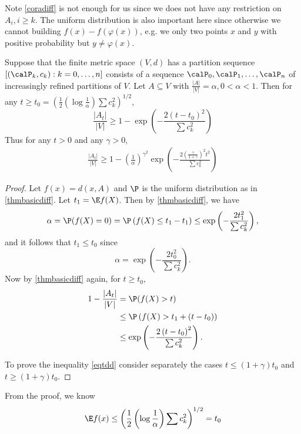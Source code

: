\documentclass{article}
\begin{document}
\begin{rema}
Note \cref{coradiff} is not enough for us since we does not have any restriction on $A_i, i\ge k$. The uniform distribution is also important here since otherwise we cannot building $f(x)-f(\varphi(x))$, e.g. we only two points $x$ and $y$ with positive probability but $y\ne \varphi(x)$.
\end{rema}
\begin{cora}\label{corbasicdiff}
Suppose that the finite metric space $( V , d )$ has a partition sequence $\left[\left( \calP_k , c _{ k }\right): k =0, \ldots, n \right]$ consists of a sequence $\calP_{0}, \calP_{1}, \ldots, \calP_{ n }$ of {increasingly refined partitions} of $V$. Let $A \subseteq V$ with $\frac{|A|}{|V|}=\alpha, 0<\alpha<1 .$ Then for any $t \geq t_{0}=\left(\frac{1}{2}\left(\log \frac{1}{\alpha}\right) \sum c_{k}^{2}\right)^{1 / 2}$,
$$
\frac{\left|A_{t}\right|}{|V|} \geq 1-\exp \left(-\frac{2\left(t-t_{0}\right)^{2}}{\sum c_{k}^{2}}\right)
$$
Thus for any $t>0$ and any $\gamma>0$,
\begin{align}
    \frac{\left|A_{t}\right|}{|V|} \geq 1-\left(\frac{1}{\alpha}\right)^{\gamma^{2}} \exp \left(-\frac{2\left(\frac{\gamma}{1+\gamma}\right)^{2} t^{2}}{\sum c_{k}^{2}}\right)\label{eqtdd}
\end{align}
\end{cora}

\begin{proof}
Let $f(x) = d(x,A)$ and $\P$ is the uniform distribution as in \cref{thmbasicdiff}. 
Let $t_{1}=\E f(X)$. Then by \cref{thmbasicdiff}, we have 
$$
\alpha= \P ( f ( X )=0)= \P \left( f ( X ) \leq t _{1}- t _{1}\right) \leq \exp \left(-\frac{2 t _{1}^{2} }{\sum c_{ k }^{2}}\right),
$$
and it follows that $t_{1} \leq t_{0}$ since 
$$
\alpha =\exp\left( -\frac{2t_0^2}{\sum c_k^2}\right).
$$
Now by \cref{thmbasicdiff} again, for $t \geq t_{0}$,
\begin{align*}
1-\frac{\left|A_{t}\right|}{|V|} &=\P(f(X)>t) \\
&\leq  \P\left(f(X)>t_{1}+\left(t-t_{0}\right)\right) \\
&\leq  \exp \left(-\frac{2\left(t-t_{0}\right)^{2} }{ \sum c_{k}^{2}}\right) .
\end{align*}

To prove the inequality \cref{eqtdd} consider separately the cases $t \leq(1+\gamma) t_{0}$ and $t \geq(1+\gamma) t _{0}$.
\end{proof}
\begin{rema} From the proof, we know
$$\E f(x)\le  \left(\frac{1}{2}\left(\log \frac{1}{\alpha}\right) \sum c_{k}^{2}\right)^{1 / 2}=t_0$$
\end{rema}
\end{document}
